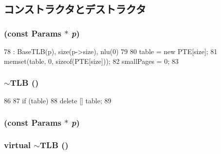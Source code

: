 \subsection{コンストラクタとデストラクタ}
\hypertarget{classMipsISA_1_1TLB_acb886bd3c59f00c21be9ceaaf25dab97}{
\subsubsection[{TLB}]{ (const {\bf Params} $\ast$ {\em p})}}
\label{classMipsISA_1_1TLB_acb886bd3c59f00c21be9ceaaf25dab97}



\begin{DoxyCode}
78     : BaseTLB(p), size(p->size), nlu(0)
79 {
80     table = new PTE[size];
81     memset(table, 0, sizeof(PTE[size]));
82     smallPages = 0;
83 }
\end{DoxyCode}
\hypertarget{classMipsISA_1_1TLB_a18a1722ab7889997b15fd7b9fc33c7ff}{
\subsubsection[{$\sim$TLB}]{\setlength{\rightskip}{0pt plus 5cm}$\sim${\bf TLB} ()}}
\label{classMipsISA_1_1TLB_a18a1722ab7889997b15fd7b9fc33c7ff}



\begin{DoxyCode}
86 {
87     if (table)
88         delete [] table;
89 }
\end{DoxyCode}
\hypertarget{classMipsISA_1_1TLB_acb886bd3c59f00c21be9ceaaf25dab97}{
\subsubsection[{TLB}]{ (const {\bf Params} $\ast$ {\em p})}}
\label{classMipsISA_1_1TLB_acb886bd3c59f00c21be9ceaaf25dab97}
\hypertarget{classMipsISA_1_1TLB_a73de9f05aa85f9da8bc42faff89d5833}{
\subsubsection[{$\sim$TLB}]{\setlength{\rightskip}{0pt plus 5cm}virtual $\sim${\bf TLB} ()}}
\label{classMipsISA_1_1TLB_a73de9f05aa85f9da8bc42faff89d5833}


